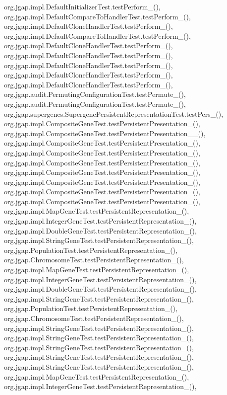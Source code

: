 org.\-jgap.\-impl.\-Default\-Initializer\-Test.\-test\-Perform\-\_(), org.\-jgap.\-impl.\-Default\-Compare\-To\-Handler\-Test.\-test\-Perform\-\_(), org.\-jgap.\-impl.\-Default\-Clone\-Handler\-Test.\-test\-Perform\-\_(), org.\-jgap.\-impl.\-Default\-Compare\-To\-Handler\-Test.\-test\-Perform\-\_(), org.\-jgap.\-impl.\-Default\-Clone\-Handler\-Test.\-test\-Perform\-\_(), org.\-jgap.\-impl.\-Default\-Clone\-Handler\-Test.\-test\-Perform\-\_(), org.\-jgap.\-impl.\-Default\-Clone\-Handler\-Test.\-test\-Perform\-\_(), org.\-jgap.\-impl.\-Default\-Clone\-Handler\-Test.\-test\-Perform\-\_(), org.\-jgap.\-impl.\-Default\-Clone\-Handler\-Test.\-test\-Perform\-\_(), org.\-jgap.\-audit.\-Permuting\-Configuration\-Test.\-test\-Permute\-\_(), org.\-jgap.\-audit.\-Permuting\-Configuration\-Test.\-test\-Permute\-\_(), org.\-jgap.\-supergenes.\-Supergene\-Persistent\-Representation\-Test.\-test\-Pers\-\_(), org.\-jgap.\-impl.\-Composite\-Gene\-Test.\-test\-Persistent\-Presentation\-\_(), org.\-jgap.\-impl.\-Composite\-Gene\-Test.\-test\-Persistent\-Presentation\-\_\-\_(), org.\-jgap.\-impl.\-Composite\-Gene\-Test.\-test\-Persistent\-Presentation\-\_(), org.\-jgap.\-impl.\-Composite\-Gene\-Test.\-test\-Persistent\-Presentation\-\_(), org.\-jgap.\-impl.\-Composite\-Gene\-Test.\-test\-Persistent\-Presentation\-\_(), org.\-jgap.\-impl.\-Composite\-Gene\-Test.\-test\-Persistent\-Presentation\-\_(), org.\-jgap.\-impl.\-Composite\-Gene\-Test.\-test\-Persistent\-Presentation\-\_(), org.\-jgap.\-impl.\-Composite\-Gene\-Test.\-test\-Persistent\-Presentation\-\_(), org.\-jgap.\-impl.\-Composite\-Gene\-Test.\-test\-Persistent\-Presentation\-\_(), org.\-jgap.\-impl.\-Map\-Gene\-Test.\-test\-Persistent\-Representation\-\_(), org.\-jgap.\-impl.\-Integer\-Gene\-Test.\-test\-Persistent\-Representation\-\_(), org.\-jgap.\-impl.\-Double\-Gene\-Test.\-test\-Persistent\-Representation\-\_(), org.\-jgap.\-impl.\-String\-Gene\-Test.\-test\-Persistent\-Representation\-\_(), org.\-jgap.\-Population\-Test.\-test\-Persistent\-Representation\-\_(), org.\-jgap.\-Chromosome\-Test.\-test\-Persistent\-Representation\-\_(), org.\-jgap.\-impl.\-Map\-Gene\-Test.\-test\-Persistent\-Representation\-\_(), org.\-jgap.\-impl.\-Integer\-Gene\-Test.\-test\-Persistent\-Representation\-\_(), org.\-jgap.\-impl.\-Double\-Gene\-Test.\-test\-Persistent\-Representation\-\_(), org.\-jgap.\-impl.\-String\-Gene\-Test.\-test\-Persistent\-Representation\-\_(), org.\-jgap.\-Population\-Test.\-test\-Persistent\-Representation\-\_(), org.\-jgap.\-Chromosome\-Test.\-test\-Persistent\-Representation\-\_(), org.\-jgap.\-impl.\-String\-Gene\-Test.\-test\-Persistent\-Representation\-\_(), org.\-jgap.\-impl.\-String\-Gene\-Test.\-test\-Persistent\-Representation\-\_(), org.\-jgap.\-impl.\-String\-Gene\-Test.\-test\-Persistent\-Representation\-\_(), org.\-jgap.\-impl.\-String\-Gene\-Test.\-test\-Persistent\-Representation\-\_(), org.\-jgap.\-impl.\-String\-Gene\-Test.\-test\-Persistent\-Representation\-\_(), org.\-jgap.\-impl.\-Map\-Gene\-Test.\-test\-Persistent\-Representation\-\_(), org.\-jgap.\-impl.\-Integer\-Gene\-Test.\-test\-Persistent\-Representation\-\_(), 
